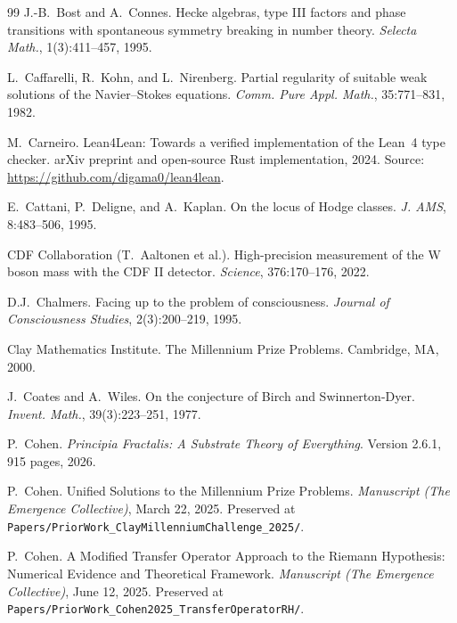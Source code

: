\documentclass[11pt,a4paper]{amsart}
\theoremstyle{plain}
\theoremstyle{definition}
\begin{document}
\begin{thebibliography}{99}
J.-B.~Bost and A.~Connes.
\newblock Hecke algebras, type III factors and phase transitions with spontaneous symmetry breaking in number theory.
\newblock \emph{Selecta Math.}, 1(3):411--457, 1995.

L.~Caffarelli, R.~Kohn, and L.~Nirenberg.
\newblock Partial regularity of suitable weak solutions of the Navier--Stokes equations.
\newblock \emph{Comm. Pure Appl. Math.}, 35:771--831, 1982.

M.~Carneiro.
\newblock Lean4Lean: Towards a verified implementation of the Lean~4 type checker.
\newblock arXiv preprint and open-source Rust implementation, 2024. Source: \url{https://github.com/digama0/lean4lean}.

E.~Cattani, P.~Deligne, and A.~Kaplan.
\newblock On the locus of Hodge classes.
\newblock \emph{J. AMS}, 8:483--506, 1995.

CDF Collaboration (T.~Aaltonen et al.).
\newblock High-precision measurement of the W boson mass with the CDF II detector.
\newblock \emph{Science}, 376:170--176, 2022.

D.J.~Chalmers.
\newblock Facing up to the problem of consciousness.
\newblock \emph{Journal of Consciousness Studies}, 2(3):200--219, 1995.

Clay Mathematics Institute.
\newblock The Millennium Prize Problems.
\newblock Cambridge, MA, 2000.

J.~Coates and A.~Wiles.
\newblock On the conjecture of Birch and Swinnerton-Dyer.
\newblock \emph{Invent. Math.}, 39(3):223--251, 1977.

P.~Cohen.
\newblock \emph{Principia Fractalis: A Substrate Theory of Everything}.
\newblock Version 2.6.1, 915 pages, 2026.

P.~Cohen.
\newblock Unified Solutions to the Millennium Prize Problems.
\newblock \emph{Manuscript (The Emergence Collective)}, March 22, 2025. Preserved at \texttt{Papers/PriorWork\_ClayMillenniumChallenge\_2025/}.

P.~Cohen.
\newblock A Modified Transfer Operator Approach to the Riemann Hypothesis: Numerical Evidence and Theoretical Framework.
\newblock \emph{Manuscript (The Emergence Collective)}, June 12, 2025. Preserved at \texttt{Papers/PriorWork\_Cohen2025\_TransferOperatorRH/}.


\end{thebibliography}
\end{document}
